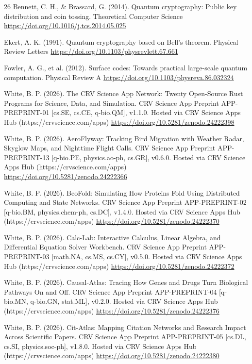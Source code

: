 \documentclass[10pt,letterpaper]{article}
\begin{document}
\begin{thebibliography}{26}
 Bennett, C. H., \& Brassard, G. (2014). Quantum cryptography: Public key distribution and coin tossing. Theoretical Computer Science \url{https://doi.org/10.1016/j.tcs.2014.05.025}

 Ekert, A. K. (1991). Quantum cryptography based on Bell’s theorem. Physical Review Letters \url{https://doi.org/10.1103/physrevlett.67.661}

 Fowler, A. G., et al. (2012). Surface codes: Towards practical large-scale quantum computation. Physical Review A \url{https://doi.org/10.1103/physreva.86.032324}

 White, B. P. (2026). The CRV Science App Network: Twenty Open-Source Rust Programs for Science, Data, and Simulation. CRV Science App Preprint APP-PREPRINT-01 [cs.SE, cs.CE, q-bio.QM], v1.1.0. Hosted via CRV Science Apps Hub (https://crvscience.com/apps) \url{https://doi.org/10.5281/zenodo.24222398}

 White, B. P. (2026). AeroFlyway: Tracking Bird Migration with Weather Radar, Skyglow Maps, and Nighttime Flight Calls. CRV Science App Preprint APP-PREPRINT-13 [q-bio.PE, physics.ao-ph, cs.GR], v0.6.0. Hosted via CRV Science Apps Hub (https://crvscience.com/apps) \url{https://doi.org/10.5281/zenodo.24222366}

 White, B. P. (2026). BeoFold: Simulating How Proteins Fold Using Distributed Computing and State Networks. CRV Science App Preprint APP-PREPRINT-02 [q-bio.BM, physics.chem-ph, cs.DC], v1.4.0. Hosted via CRV Science Apps Hub (https://crvscience.com/apps) \url{https://doi.org/10.5281/zenodo.24222370}

 White, B. P. (2026). Calc-Lab: Interactive Calculus, Linear Algebra, and Differential Equation Solver Workbench. CRV Science App Preprint APP-PREPRINT-03 [math.NA, cs.MS, cs.CY], v0.5.0. Hosted via CRV Science Apps Hub (https://crvscience.com/apps) \url{https://doi.org/10.5281/zenodo.24222372}

 White, B. P. (2026). Causal-Atlas: Tracing How Genes and Drugs Turn Biological Pathways On and Off. CRV Science App Preprint APP-PREPRINT-04 [q-bio.MN, q-bio.GN, stat.ML], v0.2.0. Hosted via CRV Science Apps Hub (https://crvscience.com/apps) \url{https://doi.org/10.5281/zenodo.24222376}

 White, B. P. (2026). Cit-Atlas: Mapping Citation Networks and Research Impact Across Scientific Papers. CRV Science App Preprint APP-PREPRINT-05 [cs.DL, cs.SI, physics.soc-ph], v1.8.0. Hosted via CRV Science Apps Hub (https://crvscience.com/apps) \url{https://doi.org/10.5281/zenodo.24222380}


\end{thebibliography}
\end{document}
